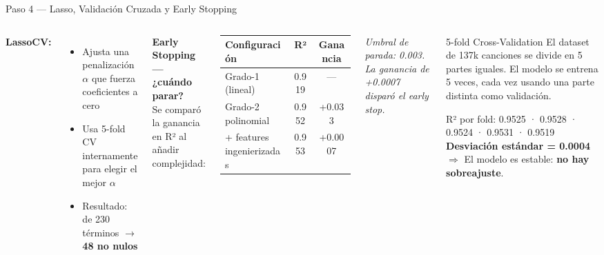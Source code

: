 \documentclass[aspectratio=169]{beamer}
\begin{document}
\begin{frame}{Paso 4 — Lasso, Validación Cruzada y Early Stopping}

  \begin{columns}
      \textbf{LassoCV:}
      \begin{itemize}
        \item Ajusta una penalización $\alpha$ que fuerza coeficientes a cero
        \item Usa 5-fold CV internamente para elegir el mejor $\alpha$
        \item Resultado: de 230 términos $\rightarrow$ \textbf{48 no nulos}
      \end{itemize}

      \bigskip
      \textbf{Early Stopping — ¿cuándo parar?}\\
      \small Se comparó la ganancia en R² al añadir complejidad:

      \begin{table}
        \small
        \begin{tabular}{lcc}
          \toprule
          Configuración & R² & Ganancia \\
          \midrule
          Grado-1 (lineal)         & 0.919 & — \\
          Grado-2 polinomial       & 0.952 & +0.033 \\
          + features ingenierizadas& 0.953 & \textcolor{aspred}{+0.0007} \\
          \bottomrule
        \end{tabular}
      \end{table}

      \small\textit{Umbral de parada: 0.003. La ganancia de +0.0007 disparó el early stop.}

      \begin{block}{5-fold Cross-Validation}
        El dataset de 137k canciones se divide en 5 partes iguales. El modelo se entrena 5 veces, cada vez usando una parte distinta como validación.
        \bigskip

        \small R² por fold: 0.9525 · 0.9528 · 0.9524 · 0.9531 · 0.9519\\
        \textbf{Desviación estándar = 0.0004}\\
        \bigskip
        $\Rightarrow$ El modelo es estable: \textbf{no hay sobreajuste}.
      \end{block}
  \end{columns}

\end{frame}
\end{document}
